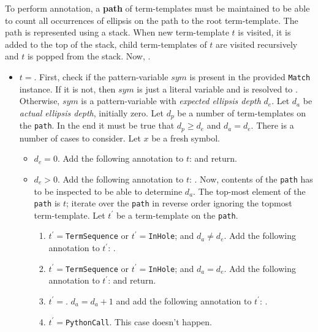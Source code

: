 To perform annotation, a \textbf{path} of term-templates must be maintained to be able to count all occurrences of ellipsis on the path to the root term-template. The path is represented using a stack. When new term-template $t$ is visited, it is added to the top of the stack, child term-templates of $t$ are visited recursively and $t$ is popped from the stack. Now, .
\begin{itemize}

\item
$t=$\TermUnresolvedSymbol. First, check if the pattern-variable $\mathit{sym}$ is present in the provided \texttt{Match} instance. If it is not, then $sym$ is just a literal variable and is resolved to .
Otherwise, $sym$ is a pattern-variable with \textit{expected ellipsis depth} $d_e$. Let $d_a$ be \textit{actual ellipsis depth}, initially zero. Let $d_p$ be a number of \RepeatNoArg term-templates on the \texttt{path}. In the end it must be true that $d_p \geq d_e$ and $d_a = d_e$. There is a number of cases to consider. Let $x$ be a fresh symbol.
	\begin{itemize}
	\item
	$d_e=0$. Add the following annotation to $t$:  and return.
	\item
	$d_e>0$. Add the following annotation to $t$: . Now, contents of the \texttt{path} has to be inspected to be able to determine $d_a$. The top-most element of the \texttt{path} is $t$; iterate over the \texttt{path} in reverse order ignoring the topmost term-template. Let $t^{\prime}$ be a term-template on the \texttt{path}.
		\begin{enumerate}
		\item
		$t^{\prime}=$\texttt{TermSequence} or $t^{\prime}=$\texttt{InHole}; and $d_a \neq d_e$. Add the following annotation to $t^{\prime}$: .
		\item
		$t^{\prime}=$\texttt{TermSequence} or $t^{\prime}=$\texttt{InHole}; and $d_a = d_e$.  Add the following annotation to $t^{\prime}$:  and return.
		\item
		$t^{\prime}=$\RepeatNoArg. $d_a = d_a + 1$ and add the following annotation to $t^{\prime}$: .
		\item
		$t^{\prime}=$\texttt{PythonCall}. This case doesn't happen.
		\end{enumerate}

\end{itemize}
\end{itemize}
